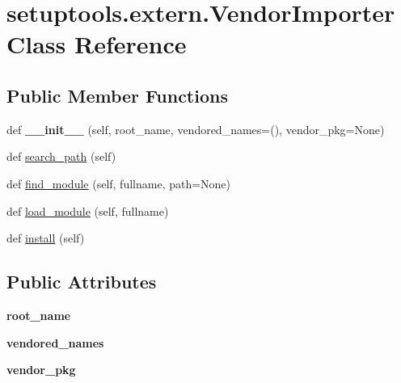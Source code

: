 \hypertarget{classsetuptools_1_1extern_1_1_vendor_importer}{}\section{setuptools.\+extern.\+Vendor\+Importer Class Reference}
\label{classsetuptools_1_1extern_1_1_vendor_importer}
\subsection*{Public Member Functions}
\begin{DoxyCompactItemize}
\item 
\mbox{\label{classsetuptools_1_1extern_1_1_vendor_importer_ab953e7ca460c58697e63e6b0f9cab962}} 
def {\bfseries \+\_\+\+\_\+init\+\_\+\+\_\+} (self, root\+\_\+name, vendored\+\_\+names=(), vendor\+\_\+pkg=None)
\item 
def \hyperlink{classsetuptools_1_1extern_1_1_vendor_importer_ad443f2f83ec349be9f556dd6cb0602a0}{search\+\_\+path} (self)
\item 
def \hyperlink{classsetuptools_1_1extern_1_1_vendor_importer_a69fa6c7e9f28a8a4494f9e9651ea3314}{find\+\_\+module} (self, fullname, path=None)
\item 
def \hyperlink{classsetuptools_1_1extern_1_1_vendor_importer_a1d782aed41c8f30932f3be255f1f9b37}{load\+\_\+module} (self, fullname)
\item 
def \hyperlink{classsetuptools_1_1extern_1_1_vendor_importer_ac222230d5bb07d63d2749d23578015b1}{install} (self)
\end{DoxyCompactItemize}
\subsection*{Public Attributes}
\begin{DoxyCompactItemize}
\item 
\mbox{\label{classsetuptools_1_1extern_1_1_vendor_importer_a2379abed53dd5125c6c01a7a05724f68}} 
{\bfseries root\+\_\+name}
\item 
\mbox{\label{classsetuptools_1_1extern_1_1_vendor_importer_a3bd8e09ceee0dc10cef5fd6db8c2e877}} 
{\bfseries vendored\+\_\+names}
\item 
\mbox{\label{classsetuptools_1_1extern_1_1_vendor_importer_a438c2bf15940a2d1ceb84510bf8de36d}} 
{\bfseries vendor\+\_\+pkg}
\end{DoxyCompactItemize}


